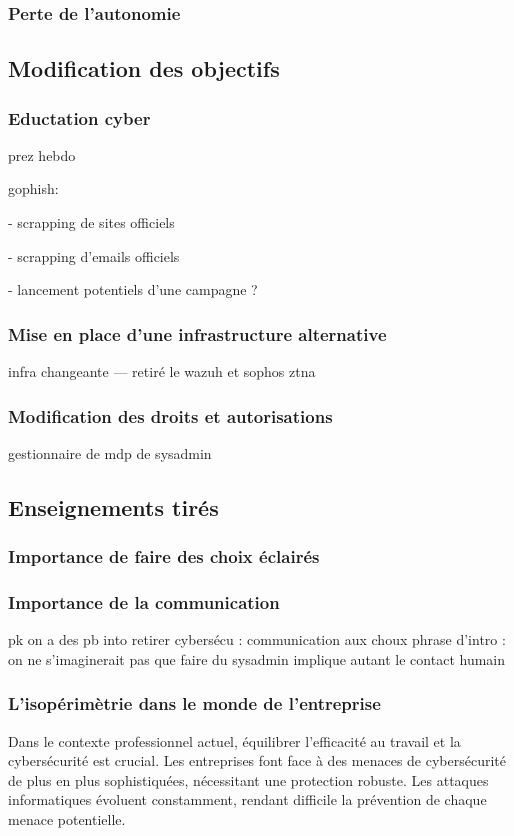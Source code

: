 \subsubsection{Perte de l'autonomie}


\subsection{Modification des objectifs}
\subsubsection{Eductation cyber}
prez hebdo

gophish:

- scrapping de sites officiels

- scrapping d'emails officiels

- lancement potentiels d'une campagne ?


\subsubsection{Mise en place d'une infrastructure alternative}
infra changeante --- retiré le wazuh et sophos ztna

\subsubsection{Modification des droits et autorisations}
gestionnaire de mdp de sysadmin


\subsection{Enseignements tirés}
\subsubsection{Importance de faire des choix éclairés}

\subsubsection{Importance de la communication}
pk on a des pb into retirer cybersécu : communication aux choux
phrase d'intro : on ne s'imaginerait pas que faire du sysadmin implique autant le contact humain 

\subsubsection{L'isopérimètrie dans le monde de l'entreprise}
Dans le contexte professionnel actuel, équilibrer l'efficacité au travail et la cybersécurité est crucial.
Les entreprises font face à des menaces de cybersécurité de plus en plus sophistiquées, nécessitant une protection robuste.
Les attaques informatiques évoluent constamment, rendant difficile la prévention de chaque menace potentielle.

